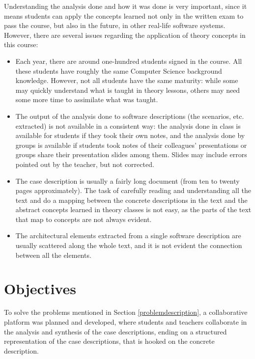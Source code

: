 \documentclass{llncs}
\begin{document}
Understanding the analysis done and how it was done is very important, since it means students can apply the concepts learned not only in the written exam to pass the course, but also in the future, in other real-life software systems.
However, there are several issues regarding the application of theory concepts in this course:
\begin{itemize}
\item Each year, there are around one-hundred students signed in the course. All these students have roughly the same Computer Science background knowledge. However, not all students have the same maturity: while some may quickly understand what is taught in theory lessons, others may need some more time to assimilate what was taught.

\item The output of the analysis done to software descriptions (the scenarios, etc. extracted) is not available in a consistent way: the analysis done in class is available for students if they took their own notes, and the analysis done by groups is available if students took notes of their colleagues' presentations or groups share their presentation slides among them. Slides may include errors pointed out by the teacher, but not corrected.

\item The case description is usually a fairly long document (from ten to twenty pages approximately). The task of carefully reading and understanding all the text and do a mapping between the concrete descriptions in the text and the abstract concepts learned in theory classes is not easy, as the parts of the text that map to concepts are not always evident.

\item The architectural elements extracted from a single software description are usually scattered along the whole text, and it is not evident the connection between all the elements.

\end{itemize}

\section{Objectives}
\label{objectives}
To solve the problems mentioned in Section \ref{problemdescription}, a collaborative platform was planned and developed, where students and teachers collaborate in the analysis and synthesis of the case descriptions, ending on a structured representation of the case descriptions, that is hooked on the concrete description. 
\end{document}

